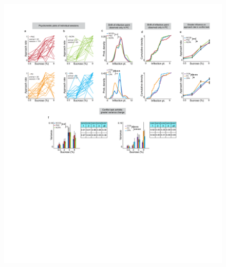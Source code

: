 \documentclass{article}
\begin{document}
\begin{figure}[H] %
  \centering
  \includegraphics[width=\textwidth, trim=50 50 50 50]{Figs/Alcohol_main_4.pdf}
\end{figure}

\captionsetup{type=figure}
\caption{\textbf{Alcohol effects proximal cost benefit tasks.} (a) Psychometric plots of approach rates for individual sessions of rats (n=20) in proximal non-conflict (PNC) and proximal conflict (PC) tasks. (b) Psychometric plots for individual sessions of all rats (n=20) in non-conflict post-alcohol (NCPA) and conflict post-alcohol (CPA) tasks. (c) A significant shift of inflection points in PC compared to CCB (KS test, p=0.0000). (d) Inflection point distribution represented as a cumulative density function. (e) Approach rates were significantly different across all task types (NCCB vs. PNC: p = 0.002, NCCB vs NCPA; p = 0.05, CCB vs PC; p $<$ 0.0001, CCB vs CPA: 0.04). (f) Significant difference in variance between NCCB and PNC in both males (F-test, p = 0.015) and females (F-test, p = 0.0153, f, left). Significant variance in CCB vs PC (F-test, p $<$ 0.0001) and CPA (F-test, p $<$ 0.0001) task performance (f, right).}
\label{fig:alcohol_main_4}
\end{document}
